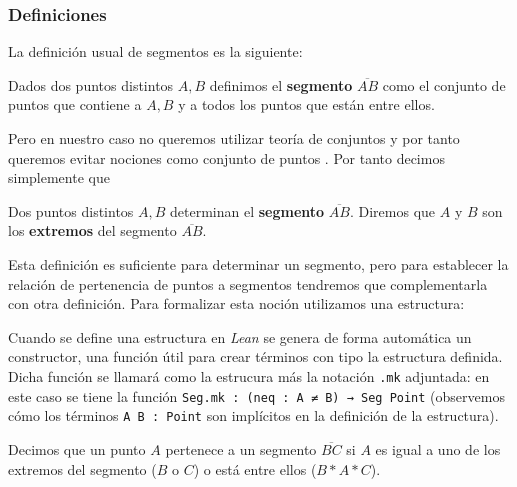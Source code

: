 
\subsubsection{Definiciones}

La definición usual de segmentos es la siguiente:

\begin{defin*}[Segmentos]
	Dados dos puntos distintos $A, B$ definimos el \textbf{segmento}
	$\overline{AB}$ como el conjunto de puntos que contiene a $A, B$ y a todos los
	puntos que están entre ellos.
\end{defin*}

Pero en nuestro caso no queremos utilizar teoría de conjuntos y por tanto
queremos evitar nociones como \guillemotleft conjunto de puntos \guillemotright.
Por tanto decimos simplemente que

\begin{defin*}[Segmentos]
	Dos puntos distintos $A, B$ determinan el \textbf{segmento} $\overline{AB}$.
	Diremos que $A$ y $B$ son los \textbf{extremos} del segmento $\overline{AB}$.
\end{defin*}

Esta definición es suficiente para determinar un segmento, pero para establecer
la relación de pertenencia de puntos a segmentos tendremos que complementarla
con otra definición. Para formalizar esta noción utilizamos una estructura:


Cuando se define una estructura en \textit{Lean} se genera de forma automática
un constructor, una función útil para crear términos con tipo la estructura
definida. Dicha función se llamará como la estrucura más la notación
\lstinline{.mk} adjuntada: en este caso se tiene la función
\lstinline{Seg.mk : (neq : A ≠ B) → Seg Point} (observemos cómo los términos
\lstinline{A B : Point} son implícitos en la definición de la estructura).

\begin{defin*}
	Decimos que un punto $A$ pertenece a un segmento $\overline{BC}$ si $A$ es
	igual a uno de los extremos del segmento ($B$ o $C$) o está entre ellos
	($B * A * C$).
\end{defin*}


